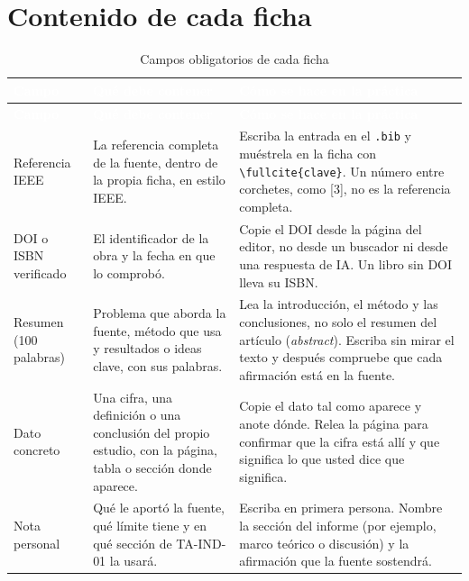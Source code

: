 \documentclass[11pt,a4paper]{article}
\newcommand{\hdr}[1]{\textcolor{white}{\textbf{#1}}}
\begin{document}
\section{Contenido de cada ficha}\label{sec:ficha}

\begin{xltabular}{\linewidth}{@{}L{3.3cm}YY@{}}
	\caption{Campos obligatorios de cada ficha}\label{tab:campos}\\
	\toprule
	\hdr{Campo} & \hdr{Qué debe contener} & \hdr{Cómo se hace en la práctica} \\
	\midrule
	\endfirsthead
	\toprule
	\hdr{Campo} & \hdr{Qué debe contener} & \hdr{Cómo se hace en la práctica} \\
	\midrule
	\endhead
	Referencia IEEE & La referencia completa de la fuente, dentro de la propia ficha, en estilo IEEE. & Escriba la entrada en el \texttt{.bib} y muéstrela en la ficha con \texttt{\textbackslash fullcite\{clave\}}. Un número entre corchetes, como [3], no es la referencia completa. \\
	\addlinespace
	DOI o ISBN verificado & El identificador de la obra y la fecha en que lo comprobó. & Copie el DOI desde la página del editor, no desde un buscador ni desde una respuesta de IA. Un libro sin DOI lleva su ISBN. \\
	\addlinespace
	Resumen (100 palabras) & Problema que aborda la fuente, método que usa y resultados o ideas clave, con sus palabras. & Lea la introducción, el método y las conclusiones, no solo el resumen del artículo (\emph{abstract}). Escriba sin mirar el texto y después compruebe que cada afirmación está en la fuente. \\
	\addlinespace
	Dato concreto & Una cifra, una definición o una conclusión del propio estudio, con la página, tabla o sección donde aparece. & Copie el dato tal como aparece y anote dónde. Relea la página para confirmar que la cifra está allí y que significa lo que usted dice que significa. \\
	\addlinespace
	Nota personal & Qué le aportó la fuente, qué límite tiene y en qué sección de TA-IND-01 la usará. & Escriba en primera persona. Nombre la sección del informe (por ejemplo, marco teórico o discusión) y la afirmación que la fuente sostendrá. \\
	\bottomrule
\end{xltabular}
\end{document}
